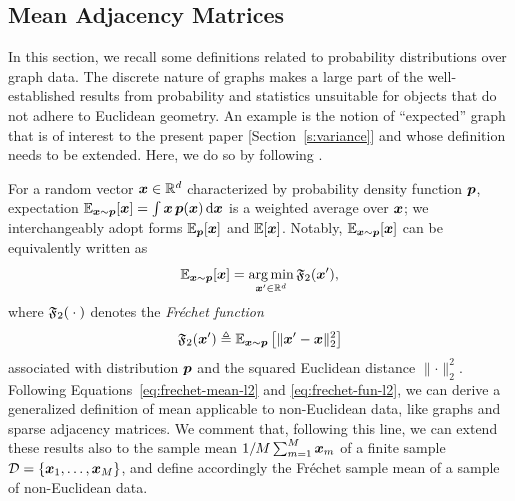 \subsection{Mean Adjacency Matrices}\label{s:prelim-frechet}

In this section, we recall some definitions related to probability distributions over graph data. 
The discrete nature of graphs makes a large part of the well-established results from probability and statistics unsuitable for objects that do not adhere to Euclidean geometry. An example is the notion of ``expected'' graph that is of interest to the present paper [Section~\ref{s:variance}] and whose definition needs to be extended. Here, we do so by following \citet{frechet1948elements}.

For a random vector ${\bm{x}}\in\mathbb{R}^d$ characterized by probability density function ${\bm{p}}$, expectation 
$\mathbb{E}_{{\bm{x}}\sim {\bm{p}}}[{\bm{x}}] = \int {\bm{x}}\, {\bm{p}}({\bm{x}})\,{\rm d}{\bm{x}}$
is a weighted average over ${\bm{x}}$; we interchangeably adopt forms $\mathbb{E}_{\bm{p}}[{\bm{x}}]$ and $\mathbb{E}[{\bm{x}}]$. Notably, $\mathbb{E}_{{\bm{x}}\sim {\bm{p}}}[{\bm{x}}]$ can be equivalently written as
\begin{equation}\label{eq:frechet-mean-l2}
\mathbb{E}_{{\bm{x}}\sim {\bm{p}}}[{\bm{x}}] 
= \operatorname*{arg\,min}_{{\bm{x}}'\in\mathbb R^d} \mathfrak{F}_{2}({\bm{x}}'),
\end{equation}
where $\mathfrak{F}_{2}({}\cdot{})$ denotes the \emph{Fr\'echet function} 
\begin{equation}\label{eq:frechet-fun-l2}
\mathfrak{F}_{2}({\bm{x}}') \triangleq \mathbb{E}_{{\bm{x}}\sim {\bm{p}}}\left[\lVert{\bm{x}}'-{\bm{x}}\rVert_2^2\right]
\end{equation}
associated with distribution ${\bm{p}}$ and the squared Euclidean distance $\lVert\cdot\rVert_2^2$. 
Following Equations~\ref{eq:frechet-mean-l2} and \ref{eq:frechet-fun-l2}, we can derive a generalized definition of mean applicable to non-Euclidean data, like graphs and sparse adjacency matrices. We comment that, following this line, we can extend these results also to the sample mean $1/M \sum_{m=1}^M {\bm{x}}_m$ of a finite sample ${\mathcal{D}} = \{{\bm{x}}_1,\dots,{\bm{x}}_M\}$, and define accordingly the Fr\'echet sample mean of a sample of non-Euclidean data.

